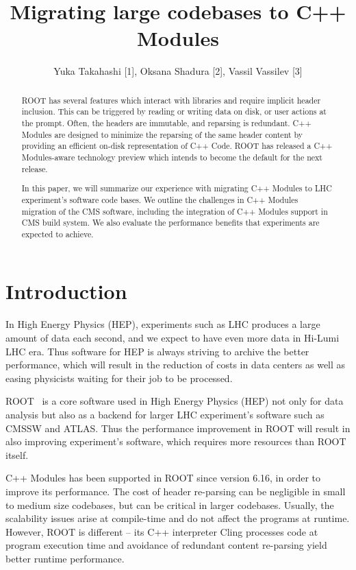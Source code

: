 \documentclass[12pt]{iopart}
\begin{document}
\title{Migrating large codebases to C++ Modules}

\author{Yuka Takahashi [1], Oksana Shadura [2], Vassil Vassilev [3]}
\address{[1] University of Tokyo, [2] University of Nebraska-Lincoln, [3] Princeton University}

\begin{abstract}
ROOT has several features which interact with libraries and require implicit header inclusion. This can be triggered by reading or writing data on disk, or user actions at the prompt. Often, the headers are immutable, and reparsing is redundant. C++ Modules are designed to minimize the reparsing of the same header content by providing an efficient on-disk representation of C++ Code. ROOT has released a C++ Modules-aware technology preview which intends to become the default for the next release.

In this paper, we will summarize our experience with migrating C++ Modules to LHC experiment's software code bases. We outline the challenges in C++ Modules migration of the CMS software, including the integration of C++ Modules support in CMS build system. We also evaluate the performance benefits that experiments are expected to achieve.
\end{abstract}

\section{Introduction}
\label{intro}

In High Energy Physics (HEP), experiments such as LHC produces a large amount of data each second, and we expect to have even more data in Hi-Lumi LHC \cite{hilumi} era. Thus software for HEP is always striving to archive the better performance, which will result in the reduction of costs in data centers as well as easing physicists waiting for their job to be processed.

ROOT~\cite{root} is a core software used in High Energy Physics (HEP) not only for data analysis but also as a backend for larger LHC experiment's software such as CMSSW and ATLAS. Thus the performance improvement in ROOT will result in also improving experiment's software, which requires more resources than ROOT itself.

C++ Modules \cite{vassil-paper} has been supported in ROOT since version 6.16, in order to improve its performance. The cost of header re-parsing can be negligible in small to medium size codebases, but can be critical in larger codebases. Usually, the scalability issues arise at compile-time and do not affect the programs at runtime. However, ROOT is different -- its C++ interpreter Cling \cite{cling} processes code at program execution time and avoidance of redundant content re-parsing yield better runtime performance.
\end{document}
